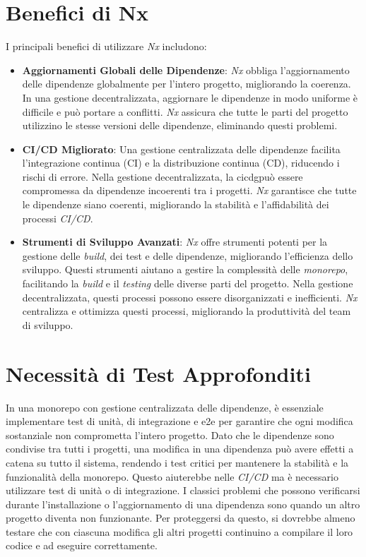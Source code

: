 \section{Benefici di Nx}
I principali benefici di utilizzare \textit{Nx} includono:

\begin{itemize}
    \item \textbf{Aggiornamenti Globali delle Dipendenze}: \textit{Nx} obbliga l'aggiornamento delle dipendenze globalmente per l'intero progetto, migliorando la coerenza.
    In una gestione decentralizzata, aggiornare le dipendenze in modo uniforme è difficile e può portare a conflitti.
    \textit{Nx} assicura che tutte le parti del progetto utilizzino le stesse versioni delle dipendenze, eliminando questi problemi.
    \item \textbf{CI/CD Migliorato}: Una gestione centralizzata delle dipendenze facilita l'integrazione continua (CI) e la distribuzione continua (CD), riducendo i rischi di errore.
    Nella gestione decentralizzata, la \gls{cicdg}\glox può essere compromessa da dipendenze incoerenti tra i progetti.
    \textit{Nx} garantisce che tutte le dipendenze siano coerenti, migliorando la stabilità e l'affidabilità dei processi \textit{CI/CD}.
    \item \textbf{Strumenti di Sviluppo Avanzati}: \textit{Nx} offre strumenti potenti per la gestione delle \textit{build}, dei test e delle dipendenze, migliorando l'efficienza dello sviluppo.
    Questi strumenti aiutano a gestire la complessità delle \textit{monorepo}, facilitando la \textit{build} e il \textit{testing} delle diverse parti del progetto.
    Nella gestione decentralizzata, questi processi possono essere disorganizzati e inefficienti.
    \textit{Nx} centralizza e ottimizza questi processi, migliorando la produttività del team di sviluppo.
\end{itemize}

\section{Necessità di Test Approfonditi}
In una monorepo con gestione centralizzata delle dipendenze, è essenziale implementare test di unità, di integrazione e \gls{e2e} per garantire che ogni modifica sostanziale non comprometta l'intero progetto.
Dato che le dipendenze sono condivise tra tutti i progetti, una modifica in una dipendenza può avere effetti a catena su tutto il sistema, rendendo i test critici per mantenere la stabilità e la funzionalità della monorepo.
Questo aiuterebbe nelle \textit{CI/CD} ma è necessario utilizzare test di unità o di integrazione.
I classici problemi che possono verificarsi durante l'installazione o l'aggiornamento di una dipendenza sono quando un altro progetto diventa non funzionante.
Per proteggersi da questo, si dovrebbe almeno testare che con ciascuna modifica gli altri progetti continuino a compilare il loro codice e ad eseguire correttamente.

\newpage